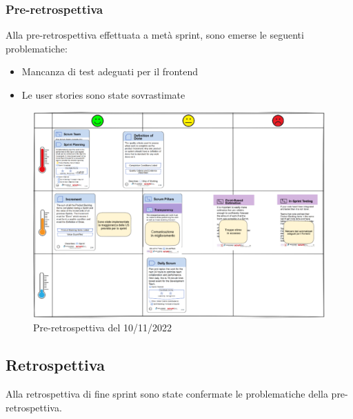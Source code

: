 \subsubsection*{Pre-retrospettiva}
Alla pre-retrospettiva effettuata a metà sprint, sono emerse le seguenti problematiche:
\begin{itemize}
    \item Mancanza di test adeguati per il frontend
    \item Le user stories sono state sovrastimate
\end{itemize}
\begin{figure}[H]
    \centering
    \includegraphics[width=15cm]{./img/sprint2/preretrospettiva.png}
    \caption{Pre-retrospettiva del 10/11/2022}
\end{figure}

\subsection*{Retrospettiva}
Alla retrospettiva di fine sprint sono state confermate le problematiche della pre-retrospettiva.